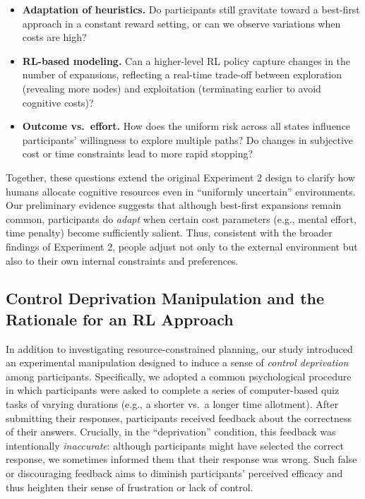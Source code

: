\documentclass[a4paper,12pt,oneside,article]{memoir}
\begin{document}
\begin{itemize}
    \item \textbf{Adaptation of heuristics.} Do participants still gravitate toward a best-first approach in a constant reward setting, or can we observe variations when costs are high?
    \item \textbf{RL-based modeling.} Can a higher-level RL policy capture changes in the number of expansions, reflecting a real-time trade-off between exploration (revealing more nodes) and exploitation (terminating earlier to avoid cognitive costs)?
    \item \textbf{Outcome vs.\ effort.} How does the uniform risk across all states influence participants’ willingness to explore multiple paths? Do changes in subjective cost or time constraints lead to more rapid stopping?
\end{itemize}

Together, these questions extend the original Experiment 2 design to clarify how humans allocate cognitive resources even in “uniformly uncertain” environments. Our preliminary evidence suggests that although best-first expansions remain common, participants do \emph{adapt} when certain cost parameters (e.g., mental effort, time penalty) become sufficiently salient. Thus, consistent with the broader findings of Experiment 2, people adjust not only to the external environment but also to their own internal constraints and preferences.

\subsection*{Control Deprivation Manipulation and the Rationale for an RL Approach}

In addition to investigating resource-constrained planning, our study introduced an experimental manipulation designed to induce a sense of \emph{control deprivation} among participants. Specifically, we adopted a common psychological procedure in which participants were asked to complete a series of computer-based quiz tasks of varying durations (e.g., a shorter vs.\ a longer time allotment). After submitting their responses, participants received feedback about the correctness of their answers. Crucially, in the “deprivation” condition, this feedback was intentionally \emph{inaccurate}: although participants might have selected the correct response, we sometimes informed them that their response was wrong. Such false or discouraging feedback aims to diminish participants’ perceived efficacy and thus heighten their sense of frustration or lack of control.
\end{document}
